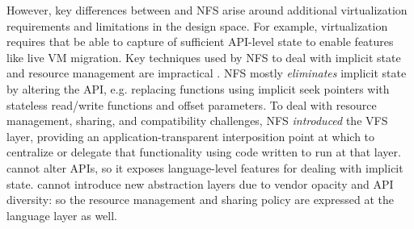 {However, key differences between \AvA and NFS arise around additional virtualization requirements and
limitations in the design space.
For example, virtualization requires that \AvA be able to capture of
sufficient API-level state to enable features like live VM migration.
Key techniques used by NFS to deal with implicit state and
resource management are impractical \AvA.
NFS mostly \emph{eliminates} implicit state by altering the API,
e.g. replacing functions using implicit seek pointers with stateless read/write functions and offset parameters.
To deal with resource management, sharing, and compatibility challenges,
NFS \emph{introduced} the VFS layer, providing
an application-transparent interposition point at which to centralize or delegate that functionality using code written
to run at that layer. \AvA cannot alter APIs, so it exposes language-level features for dealing with implicit state.
\AvA cannot introduce new abstraction layers due to vendor opacity and API diversity: so the
resource management and sharing policy are expressed at the language layer as well.



}
